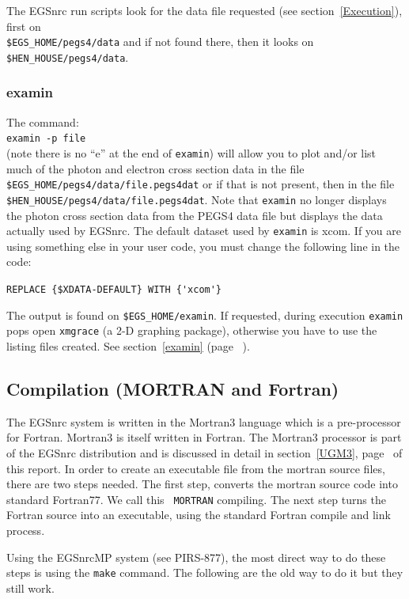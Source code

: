 The EGSnrc run scripts look for the data file requested (see
section~\ref{Execution}), first on\\
\verb+$EGS_HOME/pegs4/data+ and if not
found there, then it looks on \verb+$HEN_HOUSE/pegs4/data+.
\vfill

\subsubsection{examin}
The command:\\
\verb+examin -p file+
\\(note there is no ``e'' at the end of \verb+examin+) will allow you
to plot and/or list much of the photon and electron cross section data
in the file \verb+$EGS_HOME/pegs4/data/file.pegs4dat+ or if that is not
present, then in the file \verb+$HEN_HOUSE/pegs4/data/file.pegs4dat+. Note that
\verb+examin+ no longer displays the photon cross section data from the
PEGS4 data file but displays the data actually used by EGSnrc. The default
dataset used by \verb+examin+ is xcom. If you are using something else in your
user code, you must change the following line in the code:

\verb+REPLACE {$XDATA-DEFAULT} WITH {'xcom'}+

The output is found on \verb+$EGS_HOME/examin+. If requested, during execution
\verb+examin+ pops open \verb+xmgrace+ (a 2-D graphing package), otherwise
you have to use the listing files created. See section~\ref{examin}
(page ~\pageref{examin}).  

\subsection{Compilation (MORTRAN and Fortran)}
\label{Compilation}


The EGSnrc system is written in the Mortran3 language which is
a pre-processor for Fortran.  Mortran3 is itself written in 
Fortran.  The Mortran3 processor is part of the EGSnrc
distribution and is discussed in detail in section~\ref{UGM3},
page~\pageref{UGM3} of this report.  In order to create an executable file
from the mortran source files, there are two steps needed. The first step,
converts the mortran source code into standard Fortran77. We call this {\tt
MORTRAN} compiling.  The next step turns the Fortran source into an
executable, using the standard Fortran compile and link process.

Using the EGSnrcMP system (see PIRS-877\cite{Ka03}), the most direct way to
do these steps is using the {\tt make} command.  The following are the old
way to do it but they still work.

